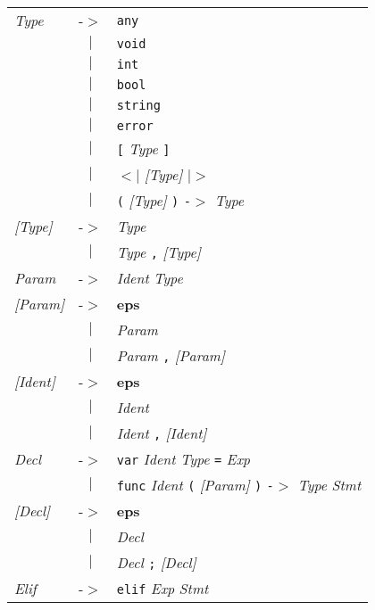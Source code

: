 \documentclass{article}
\begin{document}
\begin{center}\begin{tabular}{lll}
\textit{Type} & -$>$ & \texttt{any} \\
 & \multicolumn{1}{c}{\textbf{$|$}} & \texttt{void} \\
 & \multicolumn{1}{c}{\textbf{$|$}} & \texttt{int} \\
 & \multicolumn{1}{c}{\textbf{$|$}} & \texttt{bool} \\
 & \multicolumn{1}{c}{\textbf{$|$}} & \texttt{string} \\
 & \multicolumn{1}{c}{\textbf{$|$}} & \texttt{error} \\
 & \multicolumn{1}{c}{\textbf{$|$}} & \texttt{[} \textit{Type} \texttt{]} \\
 & \multicolumn{1}{c}{\textbf{$|$}} & \texttt{$<$$|$} \textit{[Type]} \texttt{$|$$>$} \\
 & \multicolumn{1}{c}{\textbf{$|$}} & \texttt{(} \textit{[Type]} \texttt{)} \texttt{-$>$} \textit{Type} \\
\textit{[Type]} & -$>$ & \textit{Type} \\
 & \multicolumn{1}{c}{\textbf{$|$}} & \textit{Type} \texttt{,} \textit{[Type]} \\
\textit{Param} & -$>$ & \textit{Ident} \textit{Type} \\
\textit{[Param]} & -$>$ & \textbf{eps} \\
 & \multicolumn{1}{c}{\textbf{$|$}} & \textit{Param} \\
 & \multicolumn{1}{c}{\textbf{$|$}} & \textit{Param} \texttt{,} \textit{[Param]} \\
\textit{[Ident]} & -$>$ & \textbf{eps} \\
 & \multicolumn{1}{c}{\textbf{$|$}} & \textit{Ident} \\
 & \multicolumn{1}{c}{\textbf{$|$}} & \textit{Ident} \texttt{,} \textit{[Ident]} \\
\textit{Decl} & -$>$ & \texttt{var} \textit{Ident} \textit{Type} \texttt{=} \textit{Exp} \\
 & \multicolumn{1}{c}{\textbf{$|$}} & \texttt{func} \textit{Ident} \texttt{(} \textit{[Param]} \texttt{)} \texttt{-$>$} \textit{Type} \textit{Stmt} \\
\textit{[Decl]} & -$>$ & \textbf{eps} \\
 & \multicolumn{1}{c}{\textbf{$|$}} & \textit{Decl} \\
 & \multicolumn{1}{c}{\textbf{$|$}} & \textit{Decl} \texttt{;} \textit{[Decl]} \\
\textit{Elif} & -$>$ & \texttt{elif} \textit{Exp} \textit{Stmt} \\

\end{tabular}
\end{center}
\end{document}
